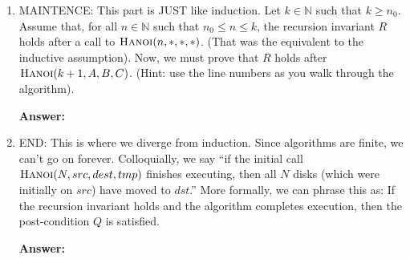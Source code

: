 \documentclass{article}
\def\N{{\mathbb N}}
\newcommand{\answer}{\textbf{Answer:}\vspace{1.8in}}
\begin{document}
\begin{enumerate}
        \answer

        Note: sometimes, just as in induction, there may be more than one base case.

    \pagebreak
    \item MAINTENCE: This part is JUST like induction.
        Let $k \in \N$ such that $k \geq n_0$.  Assume that, for all $n \in \N$ such that
        $n_0 \leq n \leq k$, the recursion invariant $R$ holds after a call to
        $\textsc{Hanoi}(n,*,*,*)$. (That was the equivalent to the inductive
        assumption).  Now, we must prove that $R$ holds after
        $\textsc{Hanoi}(k+1,A,B,C)$. (Hint: use the line numbers as you walk
        through the algorithm).

        \answer

    \item END: This is where we diverge from induction.  Since algorithms are
        finite, we can't go on forever. Colloquially, we say ``if the initial call
        $\textsc{Hanoi}(N,src,dest,tmp)$ finishes executing, then all $N$ disks
        (which were initially on $src$) have moved to $dst$.'' More formally, we
        can phrase this as: If the recursion invariant holds and the algorithm
        completes execution, then the post-condition $Q$ is satisfied.

        \answer

\end{enumerate}



\end{document}
